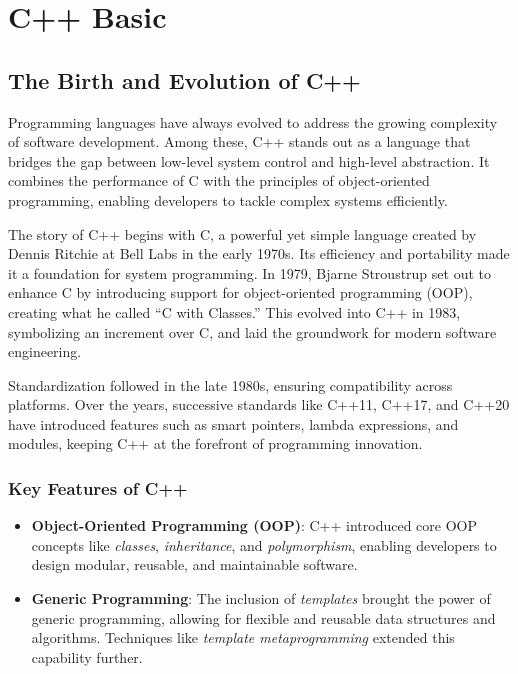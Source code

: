 \chapter{C++ Basic}

\section{The Birth and Evolution of C++}

Programming languages have always evolved to address the growing complexity of software development. Among these, C++ stands out as a language that bridges the gap between low-level system control and high-level abstraction. It combines the performance of C with the principles of object-oriented programming, enabling developers to tackle complex systems efficiently.

The story of C++ begins with C, a powerful yet simple language created by Dennis Ritchie at Bell Labs in the early 1970s. Its efficiency and portability made it a foundation for system programming. In 1979, Bjarne Stroustrup set out to enhance C by introducing support for object-oriented programming (OOP), creating what he called “C with Classes.” This evolved into C++ in 1983, symbolizing an increment over C, and laid the groundwork for modern software engineering.

Standardization followed in the late 1980s, ensuring compatibility across platforms. Over the years, successive standards like C++11, C++17, and C++20 have introduced features such as smart pointers, lambda expressions, and modules, keeping C++ at the forefront of programming innovation.

\subsection{Key Features of C++}

\begin{itemize}
    \item \textbf{Object-Oriented Programming (OOP)}: 
    C++ introduced core OOP concepts like \textit{classes}, \textit{inheritance}, and \textit{polymorphism}, enabling developers to design modular, reusable, and maintainable software.
    
    \item \textbf{Generic Programming}: 
    The inclusion of \textit{templates} brought the power of generic programming, allowing for flexible and reusable data structures and algorithms. Techniques like \textit{template metaprogramming} extended this capability further.
\end{itemize}

